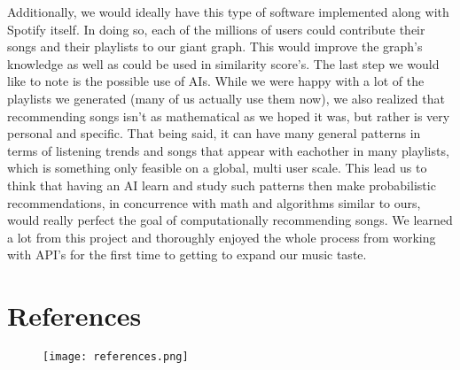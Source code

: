 \documentclass[fontsize=11pt]{article}
\begin{document}
    Additionally, we would ideally have this type of software implemented along with Spotify itself. In doing so, each of the millions of users could contribute their songs and their playlists to our giant graph. This would improve the graph's knowledge as well as could be used in similarity score's. The last step we would like to note is the possible use of AIs. While we were happy with a lot of the playlists we generated (many of us actually use them now), we also realized that recommending songs isn't as mathematical as we hoped it was, but rather is very personal and specific. That being said, it can have many general patterns in terms of listening trends and songs that appear with eachother in many playlists, which is something only feasible on a global, multi user scale. This lead us to think that having an AI learn and study such patterns then make probabilistic recommendations, in concurrence with math and algorithms similar to ours, would really perfect the goal of computationally recommending songs. We learned a lot from this project and thoroughly enjoyed the whole process from working with API's for the first time to getting to expand our music taste.

    \newpage

    \section*{References}

    \begin{figure}[htp]
        \texttt{[image: references.png]}

    \end{figure}
\end{document}
